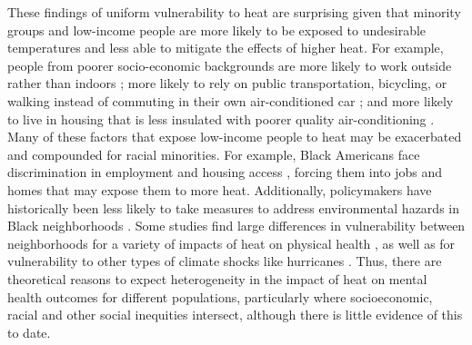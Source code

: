 \documentclass[9pt,twocolumn,twoside,lineno]{pnas-new}
\begin{document}
These findings of uniform vulnerability to heat are surprising given that minority groups and low-income people are more likely to be exposed to undesirable temperatures and less able to mitigate the effects of higher heat. For example, people from poorer socio-economic backgrounds are more likely to work outside rather than indoors \cite{Gubernot2014Oct}; more likely to rely on public transportation, bicycling, or walking instead of commuting in their own air-conditioned car \cite{Karner2015Dec}; and more likely to live in housing that is less insulated with poorer quality air-conditioning \cite{Samuelson2020Jun}. Many of these factors that expose low-income people to heat may be exacerbated and compounded for racial minorities. For example, Black Americans face discrimination in employment \cite{Kang2016, Penner2008} and housing access \cite{Desmond2015, Akbar2019}, forcing them into jobs and homes that may expose them to more heat. Additionally, policymakers have historically been less likely to take measures to address environmental hazards in Black neighborhoods \cite{Banzhaf2019}. Some studies find large differences in vulnerability between neighborhoods for a variety of impacts of heat on physical health \cite{Belanger2015Mar, Uejio2011Mar}, as well as for vulnerability to other types of climate shocks like hurricanes \cite{ferre2019hurricane, Gruebner2015Jun}. Thus, there are theoretical reasons to expect heterogeneity in the impact of heat on mental health outcomes for different populations, particularly where socioeconomic, racial and other social inequities intersect, although there is little evidence of this to date. 
\end{document}

